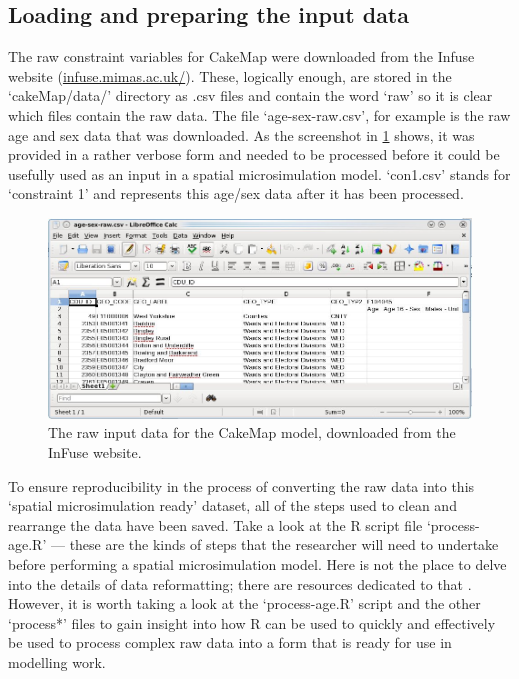 \documentclass[a4paper, 11pt, twoside]{article}
\begin{document}
\subsection{Loading and preparing the input data}
The raw constraint variables for CakeMap were downloaded from
the Infuse website (\href{http://infuse.mimas.ac.uk/}{infuse.mimas.ac.uk/}).
These, logically enough, are stored in the `cakeMap/data/' directory
as .csv files and contain the word `raw' so it is clear which files
contain the raw data. The file `age-sex-raw.csv', for example is the raw
age and sex data that was downloaded. As the screenshot in \cref{fraw} shows,
it was provided in a rather verbose form and needed to be
processed before it could be usefully used as an input
in a spatial microsimulation model. `con1.csv' stands for
`constraint 1' and represents this age/sex data after it has been processed.

\begin{figure}
 \includegraphics[width=12cm]{raw-data-screenshot}
\centering
\caption{The raw input data for the CakeMap model, downloaded from the InFuse website.}
\label{fraw}
\end{figure}


To ensure reproducibility in the process of converting the raw data into
this `spatial microsimulation ready' dataset, all of the steps used to
clean and rearrange the data have been saved. Take a look at the R script file
`process-age.R' --- these are the kinds of steps that the researcher will need to
undertake before performing a spatial microsimulation model. 
Here is not the place to delve into the details of data reformatting;
there are resources dedicated to that \citep{tidy-data, kabacoff2011r}.
However, it is worth taking a look at the `process-age.R' script and the
other `process*' files to gain insight into how R can be used to quickly
and effectively be used to process complex raw data into a form that is
ready for use in modelling work.
\end{document}
